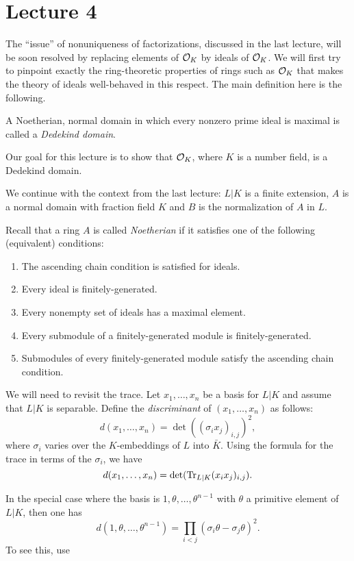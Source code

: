 \section{Lecture 4}

The ``issue'' of nonuniqueness of factorizations, discussed in the last lecture, will be soon resolved by replacing elements of $\mathcal{O}_{K}$ by ideals of $\mathcal{O}_{K}$.
We will first try to pinpoint exactly the ring-theoretic properties of rings such as $\mathcal{O}_{K}$ that makes the theory of ideals well-behaved in this respect.
The main definition here is the following.
\begin{definition}
  A Noetherian, normal domain in which every nonzero prime ideal is maximal is called a \emph{Dedekind domain}.
\end{definition}
Our goal for this lecture is to show that $\mathcal{O}_{K}$, where $K$ is a number field, is a Dedekind domain.

We continue with the context from the last lecture: $L|K$ is a finite extension, $A$ is a normal domain with fraction field $K$ and $B$ is the normalization of $A$ in $L$.

Recall that a ring $A$ is called \emph{Noetherian} if it satisfies one of the following (equivalent) conditions:
\begin{enumerate}
  \item The ascending chain condition is satisfied for ideals.
  \item Every ideal is finitely-generated.
  \item Every nonempty set of ideals has a maximal element.
  \item Every submodule of a finitely-generated module is finitely-generated.
  \item Submodules of every finitely-generated module satisfy the ascending chain condition.
\end{enumerate}

We will need to revisit the trace.
Let $x_{1},\ldots,x_{n}$ be a basis for $L|K$ and assume that $L|K$ is separable.
Define the \emph{discriminant} of $(x_{1},\ldots,x_{n})$ as follows:
\[ d(x_{1},\ldots,x_{n}) = \det((\sigma_{i}x_{j})_{i,j})^{2}, \]
where $\sigma_{i}$ varies over the $K$-embeddings of $L$ into $\bar K$.
Using the formula for the trace in terms of the $\sigma_{i}$, we have
\[ d(x_{1},\ldots,x_{n}) = \det(\operatorname{Tr}_{L|K}(x_{i}x_{j})_{i,j}). \]

In the special case where the basis is $1,\theta,\ldots,\theta^{n-1}$ with $\theta$ a primitive element of $L|K$, then one has
\[ d(1,\theta,\ldots,\theta^{n-1}) = \prod_{i<j} (\sigma_{i} \theta - \sigma_{j}\theta)^{2}. \]
To see this, use 

